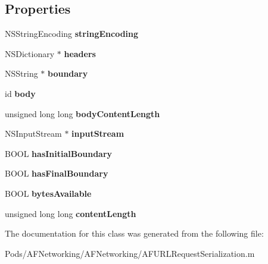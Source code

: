 \subsection*{Properties}
\begin{DoxyCompactItemize}
\item 
\mbox{\label{interface_a_f_h_t_t_p_body_part_a842a1899ac06a5ca474a00d1c7a7d7fd}} 
N\+S\+String\+Encoding {\bfseries string\+Encoding}
\item 
\mbox{\label{interface_a_f_h_t_t_p_body_part_ae26ac134d0864251aed8657f1c18af9f}} 
N\+S\+Dictionary $\ast$ {\bfseries headers}
\item 
\mbox{\label{interface_a_f_h_t_t_p_body_part_a26a57617bd4096e0a7f7ed62b6251923}} 
N\+S\+String $\ast$ {\bfseries boundary}
\item 
\mbox{\label{interface_a_f_h_t_t_p_body_part_ac1114eccbce0168c1638381fbcfb2c12}} 
id {\bfseries body}
\item 
\mbox{\label{interface_a_f_h_t_t_p_body_part_a589888098707edf77aa77087dd0411d3}} 
unsigned long long {\bfseries body\+Content\+Length}
\item 
\mbox{\label{interface_a_f_h_t_t_p_body_part_ac3f0670e909127c919888f6d71c3bb54}} 
N\+S\+Input\+Stream $\ast$ {\bfseries input\+Stream}
\item 
\mbox{\label{interface_a_f_h_t_t_p_body_part_aa43219e1933ce7f23e3925a771ae3123}} 
B\+O\+OL {\bfseries has\+Initial\+Boundary}
\item 
\mbox{\label{interface_a_f_h_t_t_p_body_part_a744eb48419786f372cf19da986dca356}} 
B\+O\+OL {\bfseries has\+Final\+Boundary}
\item 
\mbox{\label{interface_a_f_h_t_t_p_body_part_af0479ae737ea32125a69debf91b87664}} 
B\+O\+OL {\bfseries bytes\+Available}
\item 
\mbox{\label{interface_a_f_h_t_t_p_body_part_a9e1bea39dee4d8a0c13132f2abd1bd94}} 
unsigned long long {\bfseries content\+Length}
\end{DoxyCompactItemize}


The documentation for this class was generated from the following file\+:\begin{DoxyCompactItemize}
\item 
Pods/\+A\+F\+Networking/\+A\+F\+Networking/A\+F\+U\+R\+L\+Request\+Serialization.\+m\end{DoxyCompactItemize}
